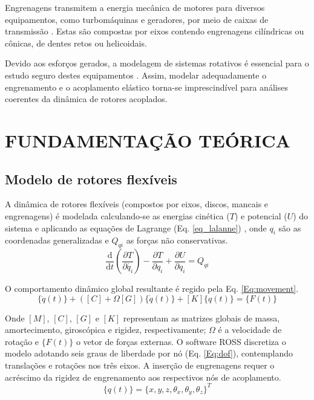 \documentclass[10pt,fleqn,a4paper,twoside]{article}
\begin{document}
	Engrenagens transmitem a energia mecânica de motores para diversos equipamentos, como turbomáquinas e geradores, por meio de caixas de transmissão \citep{sousa2026}. Estas são compostas por eixos contendo engrenagens cilíndricas ou cônicas, de dentes retos ou helicoidais. 
	
	Devido aos esforços gerados, a modelagem de sistemas rotativos é essencial para o estudo seguro destes equipamentos \citep{Friswell2010}. Assim, modelar adequadamente o engrenamento e o acoplamento elástico torna-se imprescindível para análises coerentes da dinâmica de rotores acoplados.
	
	\section{FUNDAMENTAÇÃO TEÓRICA}
	
	\subsection{Modelo de rotores flexíveis}
	
	A dinâmica de rotores flexíveis (compostos por eixos, discos, mancais e engrenagens) é modelada calculando-se as energias cinética ($T$) e potencial ($U$) do sistema e aplicando as equações de Lagrange (Eq. \ref{eq_lalanne}) \citep{Lalanne1998}, onde $q_i$ são as coordenadas generalizadas e $Q_{qi}$ as forças não conservativas.
	\begin{equation}
		\frac{\mathrm{d} }{\mathrm{d} t}\left ( \frac{\partial T}{\partial \dot{q_i}} \right )-\frac{\partial T}{\partial q_i} + \frac{\partial U}{\partial q_i}=Q_{qi}
		\label{eq_lalanne}
	\end{equation}
	
	O comportamento dinâmico global resultante é regido pela Eq. \ref{Eq:movement}.
	\begin{equation}
		[M]\{\ddot{q}(t)\}+([C]+\Omega [G])\{\dot{q}(t)\}+[K]\{q(t)\}=\{F(t)\}
		\label{Eq:movement}
	\end{equation}
	
	Onde $[M]$, $[C]$, $[G]$ e $[K]$ representam as matrizes globais de massa, amortecimento, giroscópica e rigidez, respectivamente; $\Omega$ é a velocidade de rotação e $\{F(t)\}$ o vetor de forças externas. O software ROSS \citep{ross, jessica2025} discretiza o modelo adotando seis graus de liberdade por nó (Eq. \ref{Eq:dof}), contemplando translações e rotações nos três eixos. A inserção de engrenagens requer o acréscimo da rigidez de engrenamento aos respectivos nós de acoplamento.
	\vspace*{-0.5cm}
	\begin{equation}
		\{q(t)\} = \{x,y,z, \theta_x, \theta_y, \theta_z\}^{T}
		\label{Eq:dof}
	\end{equation}
	
\end{document}
